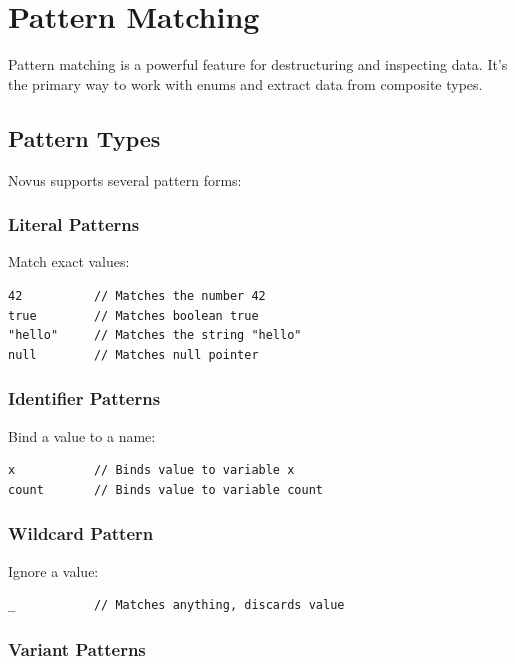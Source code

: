 \section{Pattern Matching}

Pattern matching is a powerful feature for destructuring and inspecting data. It's the primary way to work with enums and extract data from composite types.

\subsection{Pattern Types}

Novus supports several pattern forms:

\subsubsection{Literal Patterns}

Match exact values:

\begin{lstlisting}
42          // Matches the number 42
true        // Matches boolean true
"hello"     // Matches the string "hello"
null        // Matches null pointer
\end{lstlisting}

\subsubsection{Identifier Patterns}

Bind a value to a name:

\begin{lstlisting}
x           // Binds value to variable x
count       // Binds value to variable count
\end{lstlisting}

\subsubsection{Wildcard Pattern}

Ignore a value:

\begin{lstlisting}
_           // Matches anything, discards value
\end{lstlisting}

\subsubsection{Variant Patterns}

